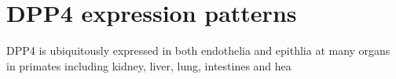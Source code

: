 \section{DPP4 expression patterns}
DPP4 is ubiquitously expressed in both endothelia and epithlia at many organs in primates including kidney, liver, lung, intestines and hea